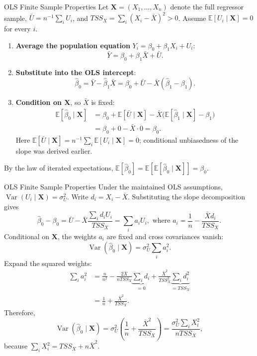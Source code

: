 \documentclass[notes,10pt, aspectratio=169]{beamer}
\begin{document}
\begin{frame}{OLS Finite Sample Properties}
\footnotesize
\setlength{\abovedisplayskip}{4pt}
\setlength{\belowdisplayskip}{4pt}
Let $\mathbf{X}=(X_1,\ldots,X_n)$ denote the full regressor sample,
$\bar U=n^{-1}\sum_i U_i$, and $TSS_X=\sum_i(X_i-\bar X)^2>0$.
Assume $\mathbb{E}[U_i\mid\mathbf{X}]=0$ for every $i$.
\begin{enumerate}
\item \textbf{Average the population equation} $Y_i=\beta_0+\beta_1X_i+U_i$:
\[
\bar Y=\beta_0+\beta_1\bar X+\bar U.
\]
\item \textbf{Substitute into the OLS intercept}:
\[
\hat\beta_0=\bar Y-\hat\beta_1\bar X
=\beta_0+\bar U-\bar X(\hat\beta_1-\beta_1).
\]
\item \textbf{Condition on $\mathbf{X}$}, so $\bar X$ is fixed:
\[
\begin{aligned}
\mathbb{E}[\hat\beta_0\mid\mathbf{X}]
&=\beta_0+\mathbb{E}[\bar U\mid\mathbf{X}]
-\bar X\bigl(\mathbb{E}[\hat\beta_1\mid\mathbf{X}]-\beta_1\bigr)\\
&=\beta_0+0-\bar X\cdot0=\beta_0.
\end{aligned}
\]
Here $\mathbb{E}[\bar U\mid\mathbf{X}]=n^{-1}\sum_i\mathbb{E}[U_i\mid\mathbf{X}]=0$;
conditional unbiasedness of the slope was derived earlier.
\end{enumerate}
By the law of iterated expectations,
$\mathbb{E}[\hat\beta_0]=\mathbb{E}[\mathbb{E}[\hat\beta_0\mid\mathbf{X}]]=\beta_0$.
\end{frame}

\begin{frame}{OLS Finite Sample Properties}
\footnotesize
\setlength{\abovedisplayskip}{4pt}
\setlength{\belowdisplayskip}{4pt}
Under the maintained OLS assumptions,
$\operatorname{Var}(U_i\mid\mathbf{X})=\sigma_U^2$.
Write $d_i=X_i-\bar X$. Substituting the slope decomposition gives
\[
\hat\beta_0-\beta_0
=\bar U-\bar X\frac{\sum_i d_i U_i}{TSS_X}
=\sum_i a_i U_i,
\text{ where }a_i=\frac1n-\frac{\bar X d_i}{TSS_X}.
\]
Conditional on $\mathbf{X}$, the weights $a_i$ are fixed and cross covariances vanish:
\[
\operatorname{Var}(\hat\beta_0\mid\mathbf{X})=\sigma_U^2\sum_i a_i^2.
\]
Expand the squared weights:
\[
\begin{aligned}
\sum_i a_i^2
&=\frac{n}{n^2}
-\frac{2\bar X}{nTSS_X}\underbrace{\sum_i d_i}_{=0}
+\frac{\bar X^2}{TSS_X^2}\underbrace{\sum_i d_i^2}_{=TSS_X}\\
&=\frac1n+\frac{\bar X^2}{TSS_X}.
\end{aligned}
\]
Therefore,
\[
\boxed{\operatorname{Var}(\hat\beta_0\mid\mathbf{X})
=\sigma_U^2\left(\frac1n+\frac{\bar X^2}{TSS_X}\right)
=\frac{\sigma_U^2\sum_i X_i^2}{nTSS_X}},
\]
because $\sum_i X_i^2=TSS_X+n\bar X^2$.
\end{frame}
\end{document}
